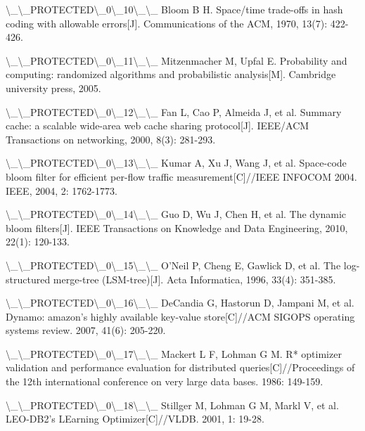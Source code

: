 \textbackslash{}_\textbackslash{}_PROTECTED\textbackslash{}_0\textbackslash{}_10\textbackslash{}_\textbackslash{}_ Bloom B H. Space/time trade-offs in hash coding with allowable errors[J]. Communications of the ACM, 1970, 13(7): 422-426.

\textbackslash{}_\textbackslash{}_PROTECTED\textbackslash{}_0\textbackslash{}_11\textbackslash{}_\textbackslash{}_ Mitzenmacher M, Upfal E. Probability and computing: randomized algorithms and probabilistic analysis[M]. Cambridge university press, 2005.

\textbackslash{}_\textbackslash{}_PROTECTED\textbackslash{}_0\textbackslash{}_12\textbackslash{}_\textbackslash{}_ Fan L, Cao P, Almeida J, et al. Summary cache: a scalable wide-area web cache sharing protocol[J]. IEEE/ACM Transactions on networking, 2000, 8(3): 281-293.

\textbackslash{}_\textbackslash{}_PROTECTED\textbackslash{}_0\textbackslash{}_13\textbackslash{}_\textbackslash{}_ Kumar A, Xu J, Wang J, et al. Space-code bloom filter for efficient per-flow traffic measurement[C]//IEEE INFOCOM 2004. IEEE, 2004, 2: 1762-1773.

\textbackslash{}_\textbackslash{}_PROTECTED\textbackslash{}_0\textbackslash{}_14\textbackslash{}_\textbackslash{}_ Guo D, Wu J, Chen H, et al. The dynamic bloom filters[J]. IEEE Transactions on Knowledge and Data Engineering, 2010, 22(1): 120-133.

\textbackslash{}_\textbackslash{}_PROTECTED\textbackslash{}_0\textbackslash{}_15\textbackslash{}_\textbackslash{}_ O'Neil P, Cheng E, Gawlick D, et al. The log-structured merge-tree (LSM-tree)[J]. Acta Informatica, 1996, 33(4): 351-385.

\textbackslash{}_\textbackslash{}_PROTECTED\textbackslash{}_0\textbackslash{}_16\textbackslash{}_\textbackslash{}_ DeCandia G, Hastorun D, Jampani M, et al. Dynamo: amazon's highly available key-value store[C]//ACM SIGOPS operating systems review. 2007, 41(6): 205-220.

\textbackslash{}_\textbackslash{}_PROTECTED\textbackslash{}_0\textbackslash{}_17\textbackslash{}_\textbackslash{}_ Mackert L F, Lohman G M. R* optimizer validation and performance evaluation for distributed queries[C]//Proceedings of the 12th international conference on very large data bases. 1986: 149-159.

\textbackslash{}_\textbackslash{}_PROTECTED\textbackslash{}_0\textbackslash{}_18\textbackslash{}_\textbackslash{}_ Stillger M, Lohman G M, Markl V, et al. LEO-DB2's LEarning Optimizer[C]//VLDB. 2001, 1: 19-28.


